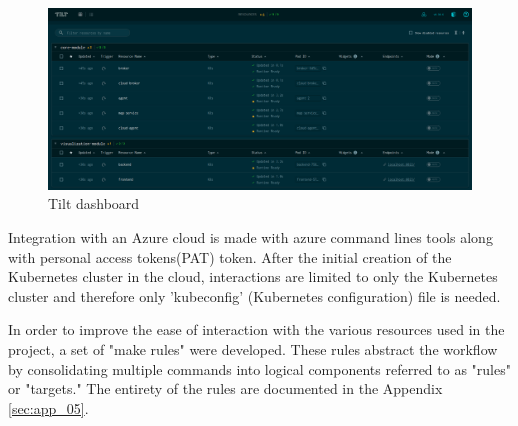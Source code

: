 \begin{figure}[H]
    \centering
    \includegraphics[width=\textwidth]{pictures/tilt.png}
    \caption{Tilt dashboard}
    \label{fig:tilt}
\end{figure}

Integration with an Azure cloud is made with azure command lines tools along with personal access tokens(PAT) token. After the initial creation of the Kubernetes cluster in the cloud, interactions are limited to only the Kubernetes cluster and therefore only 'kubeconfig' \cite{kubernetes_docs} (Kubernetes configuration) file is needed.

In order to improve the ease of interaction with the various resources used in the project, a set of "make rules" were developed. These rules abstract the workflow by consolidating multiple commands into logical components referred to as "rules" or "targets." The entirety of the rules are documented in the Appendix \ref{sec:app_05}.

